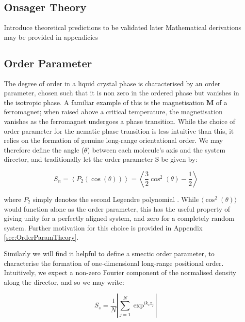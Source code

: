 \documentclass[11pt, a4paper]{article} %
\begin{document}
\subsection{Onsager Theory}
Introduce theoretical predictions to be validated later
Mathematical derivations may be provided in appendicies
\subsection{Order Parameter}

The degree of order in a liquid crystal phase is characterised by an order parameter, chosen such that it is non zero in the ordered phase but vanishes in the isotropic phase. A familiar example of this is the magnetisation $\textbf{M}$ of a ferromagnet; when raised above a critical temperature, the magnetisation vanishes as the ferromagnet undergoes a phase transition. While the choice of order parameter for the nematic phase transition is less intuitive than this, it relies on the formation of genuine long-range orientational order. We may therefore define the angle ($\theta$) between each molecule's axis and the system director, and traditionally let the order parameter S be given by:

\begin{equation}
S_{n} = \left\langle P_{2}(\cos(\theta)) \right\rangle = \left\langle \frac{3}{2}\cos^{2}(\theta) - \frac{1}{2} \right\rangle 
\end{equation}

where $P_{2}$ simply denotes the second Legendre polynomial \cite{deGennes1993}. While $\langle \cos^{2}(\theta) \rangle$ would function alone as the order parameter, this has the useful property of giving unity for a perfectly aligned system, and zero for a completely random system. Further motivation for this choice is provided in Appendix \ref{sec:OrderParamTheory}.


Similarly we will find it helpful to define a smectic order parameter, to characterise the formation of one-dimensional long-range positional order. Intuitively, we expect a non-zero Fourier component of the normalised density along the director, and so we may write:

\begin{equation}
S_{s} = \frac{1}{N} \left\lvert \sum_{j=1}^{N} \exp^{ik_{z}z_{j}} \right\rvert
\end{equation}
\end{document}
